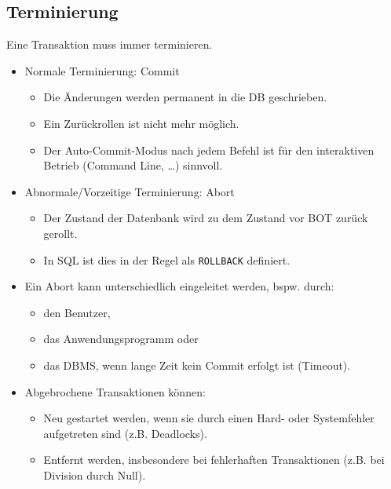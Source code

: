 		\subsection{Terminierung} %
			Eine Transaktion muss immer terminieren.
			\begin{itemize}
				\item Normale Terminierung: Commit
					\begin{itemize}
						\item Die Änderungen werden permanent in die DB geschrieben.
						\item Ein Zurückrollen ist nicht mehr möglich.
						\item Der Auto-Commit-Modus nach jedem Befehl ist für den interaktiven Betrieb (Command Line, \dots) sinnvoll.
					\end{itemize}
				\item Abnormale/Vorzeitige Terminierung: Abort
					\begin{itemize}
						\item Der Zustand der Datenbank wird zu dem Zustand vor BOT zurück gerollt.
						\item In SQL ist dies in der Regel als \lstinline|ROLLBACK| definiert.
					\end{itemize}
				\item Ein Abort kann unterschiedlich eingeleitet werden, bspw. durch:
					\begin{itemize}
						\item den Benutzer,
						\item das Anwendungsprogramm oder
						\item das DBMS, wenn lange Zeit kein Commit erfolgt ist (Timeout).
					\end{itemize}
				\item Abgebrochene Transaktionen können:
					\begin{itemize}
						\item Neu gestartet werden, wenn sie durch einen Hard- oder Systemfehler aufgetreten sind (z.B. Deadlocks).
						\item Entfernt werden, insbesondere bei fehlerhaften Transaktionen (z.B. bei Division durch Null).
					\end{itemize}
			\end{itemize}


